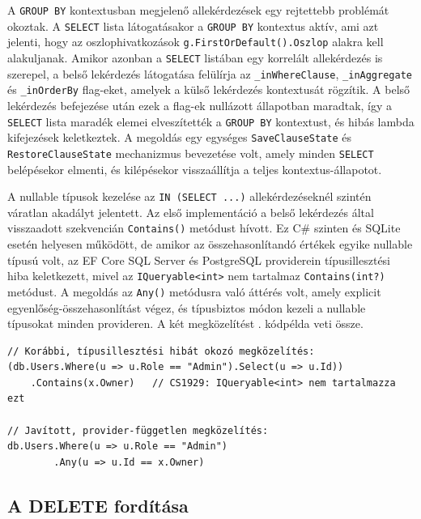 \documentclass[a4paper,12pt]{article}
\begin{document}
A \texttt{GROUP BY} kontextusban megjelenő allekérdezések egy rejtettebb problémát okoztak. A \texttt{SELECT} lista látogatásakor a \texttt{GROUP BY} kontextus aktív, ami azt jelenti, hogy az oszlophivatkozások \texttt{g.FirstOrDefault().Oszlop} alakra kell alakuljanak. Amikor azonban a \texttt{SELECT} listában egy korrelált allekérdezés is szerepel, a belső lekérdezés látogatása felülírja az \texttt{\_inWhereClause}, \texttt{\_inAggregate} és \texttt{\_inOrderBy} flag-eket, amelyek a külső lekérdezés kontextusát rögzítik. A belső lekérdezés befejezése után ezek a flag-ek nullázott állapotban maradtak, így a \texttt{SELECT} lista maradék elemei elveszítették a \texttt{GROUP BY} kontextust, és hibás lambda kifejezések keletkeztek. A megoldás egy egységes \texttt{SaveClauseState} és \texttt{RestoreClauseState} mechanizmus bevezetése volt, amely minden \texttt{SELECT} belépésekor elmenti, és kilépésekor visszaállítja a teljes kontextus-állapotot.

A nullable típusok kezelése az \texttt{IN (SELECT ...)} allekérdezéseknél szintén váratlan akadályt jelentett. Az első implementáció a belső lekérdezés által visszaadott szekvencián \texttt{Contains()} metódust hívott. Ez C\# szinten és SQLite esetén helyesen működött, de amikor az összehasonlítandó értékek egyike nullable típusú volt, az EF Core SQL Server és PostgreSQL providerein típusillesztési hiba keletkezett, mivel az \texttt{IQueryable<int>} nem tartalmaz \texttt{Contains(int?)} metódust. A megoldás az \texttt{Any()} metódusra való áttérés volt, amely explicit egyenlőség-összehasonlítást végez, és típusbiztos módon kezeli a nullable típusokat minden provideren. A két megközelítést . kódpélda veti össze.

\newpage

\begin{lstlisting}[caption={Nullable típusillesztési probléma és megoldása}, label={lst:nullable}]
// Korábbi, típusillesztési hibát okozó megközelítés:
(db.Users.Where(u => u.Role == "Admin").Select(u => u.Id))
    .Contains(x.Owner)   // CS1929: IQueryable<int> nem tartalmazza ezt

// Javított, provider-független megközelítés:
db.Users.Where(u => u.Role == "Admin")
        .Any(u => u.Id == x.Owner)
\end{lstlisting}

\subsection{A DELETE fordítása}
\end{document}
